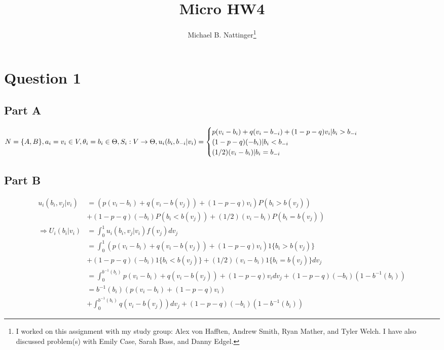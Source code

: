 \documentclass[11pt]{article} %
\title{Micro HW4}
\author{Michael B. Nattinger\footnote{I worked on this assignment with my study group: Alex von Hafften, Andrew Smith, Ryan Mather, and Tyler Welch. I have also discussed problem(s) with Emily Case, Sarah Bass, and Danny Edgel.}}
\begin{document}
\maketitle

\section{Question 1}
\subsection{Part A} %
$N = \{ A,B \}, a_i = v_i \in V, \theta_i = b_i \in \Theta, S_i: V \rightarrow \Theta, \\u_i(b_i,b_{-i}|v_i) = \begin{cases} p(v_i - b_i) + q(v_i - b_{-i}) +(1-p-q)v_i | b_{i}>b_{-i} \\ (1-p-q)( - b_i) | b_{i}<b_{-i} \\ (1/2)(v_i - b_i) | b_{i}=b_{-i} \end{cases}$
\subsection{Part B}
\begin{align*}
u_i(b_i,v_j|v_i) &= (p(v_i - b_i) + q(v_i - b(v_j)) + (1-p-q)v_i)P(b_i>b(v_j))\\
&+ (1-p-q)(- b_i)P(b_i<b(v_j)) + (1/2)(v_i - b_i)P(b_i=b(v_j))\\
\Rightarrow U_i(b_i|v_i) &= \int_0^1 u_i(b_i,v_j|v_i)f(v_j)dv_j\\
&=  \int_0^1(p(v_i - b_i) + q(v_i - b(v_j))+ (1-p-q)v_i)1\{b_i>b(v_j)\}\\
&+ (1-p-q)(- b_i)1\{b_i<b(v_j)\} + (1/2)(v_i - b_i)1\{b_i=b(v_j)\}dv_j\\
&=\int_{0}^{b^{-1}(b_i)}p(v_i - b_i) + q(v_i - b(v_j))+ (1-p-q)v_i dv_j +(1-p-q)( - b_i)(1-b^{-1}(b_i))\\
&= b^{-1}(b_i)(p(v_i - b_i)+ (1-p-q)v_i) \\&+ \int_{0}^{b^{-1}(b_i)}q(v_i - b(v_j))dv_j + (1-p-q)( - b_i)(1-b^{-1}(b_i))
\end{align*}
\end{document}
